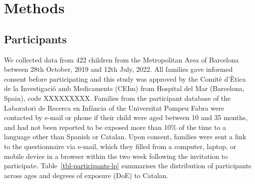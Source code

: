 \documentclass[
  letterpaper,
  DIV=11,
  numbers=noendperiod]{scrartcl}
\begin{document}
\hypertarget{sec-methods}{%
\section{Methods}\label{sec-methods}}

\hypertarget{sec-participants}{%
\subsection{Participants}\label{sec-participants}}

We collected data from 422 children from the Metropolitan Area of
Barcelona between 28th October, 2019 and 12th July, 2022. All families
gave informed consent before participating and this study was approved
by the Comitè d'Ètica de la Investigació amb Medicaments (CEIm) from
Hospital del Mar (Barcelona, Spain), code XXXXXXXXX. Families from the
participant database of the Laboratori de Recerca en Infància of the
Universitat Pompeu Fabra were contacted by e-mail or phone if their
child were aged between 10 and 35 months, and had not been reported to
be exposed more than 10\% of the time to a language other than Spanish
or Catalan. Upon consent, families were sent a link to the questionnaire
via e-mail, which they filled from a computer, laptop, or mobile device
in a browser within the two week following the invitation to
participate. Table~\ref{tbl-participants-lp} summarises the distribution
of participants across ages and degrees of exposure (DoE) to Catalan.
\end{document}
